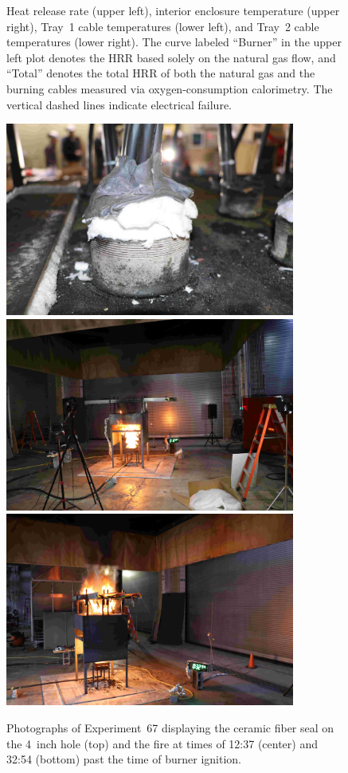 \begin{figure}[H]
\caption[HRR and temperatures of Experiment 67]{Heat release rate (upper left), interior enclosure temperature (upper right), Tray~1 cable temperatures (lower left), and Tray~2 cable temperatures (lower right). The curve labeled ``Burner'' in the upper left plot denotes the HRR based solely on the natural gas flow, and ``Total'' denotes the total HRR of both the natural gas and the burning cables measured via oxygen-consumption calorimetry. The vertical dashed lines indicate electrical failure.}
\label{fig:Test_67}
\end{figure}

\begin{figure}[p]
\centering
\includegraphics[height=2.50in]{../FIGURES/Test_67_Photo_1} \\ \vspace{0.1in}
\includegraphics[height=2.50in]{../FIGURES/Test_67_Photo_2} \\ \vspace{0.1in}
\includegraphics[height=2.50in]{../FIGURES/Test_67_Photo_3}
\caption[Photographs of Experiment~67]{Photographs of Experiment~67 displaying the ceramic fiber seal on the 4~inch hole (top) and the fire at times of 12:37 (center) and 32:54 (bottom) past the time of burner ignition.}
\label{fig:Test_67_photos}
\end{figure}



